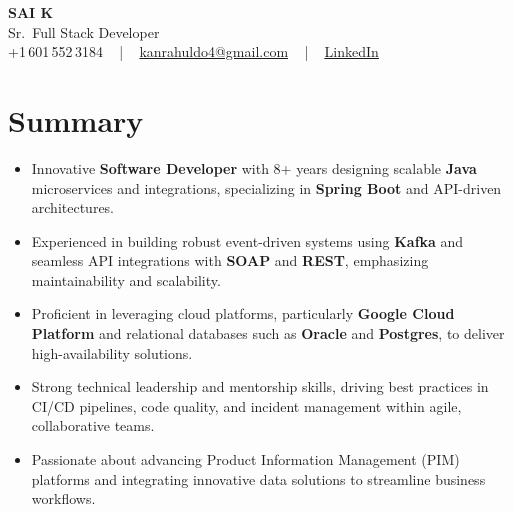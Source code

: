 \documentclass[letterpaper,11pt]{article}
\newcommand{\resumeItem}[1]{
  \item\footnotesize{
    {#1 \vspace{-2pt}}
  }
}
\newcommand{\resumeItemListStart}{\begin{itemize}[leftmargin=*]}
\newcommand{\resumeItemListEnd}{\end{itemize}\vspace{-5pt}}
\begin{document}
\begin{center}
    {\fontsize{14pt}{12pt}\selectfont \textbf{\MakeUppercase{Sai K}}}\\ \vspace{2pt}
    \fontsize{10pt}{12pt}\selectfont Sr.\ Full Stack Developer\\ \vspace{2pt}
    \fontsize{10pt}{12pt}\selectfont +1\,601\,552\,3184 ~ | ~
    \href{mailto:kanrahuldo4@gmail.com}{kanrahuldo4@gmail.com} ~ | ~
    \href{https://www.linkedin.com/in/srrrk/}{\color{blue}\underline{LinkedIn}}
    \vspace{-10pt}
\end{center}

\section{Summary}
\fontsize{9pt}{10pt}\selectfont
\resumeItemListStart
  \resumeItem{Innovative \textbf{Software Developer} with 8+ years designing scalable \textbf{Java} microservices and integrations, specializing in \textbf{Spring Boot} and API-driven architectures.}
  \resumeItem{Experienced in building robust event-driven systems using \textbf{Kafka} and seamless API integrations with \textbf{SOAP} and \textbf{REST}, emphasizing maintainability and scalability.}
  \resumeItem{Proficient in leveraging cloud platforms, particularly \textbf{Google Cloud Platform} and relational databases such as \textbf{Oracle} and \textbf{Postgres}, to deliver high-availability solutions.}
  \resumeItem{Strong technical leadership and mentorship skills, driving best practices in CI/CD pipelines, code quality, and incident management within agile, collaborative teams.}
  \resumeItem{Passionate about advancing Product Information Management (PIM) platforms and integrating innovative data solutions to streamline business workflows.}
\resumeItemListEnd
\vspace{-6pt}

\end{document}
